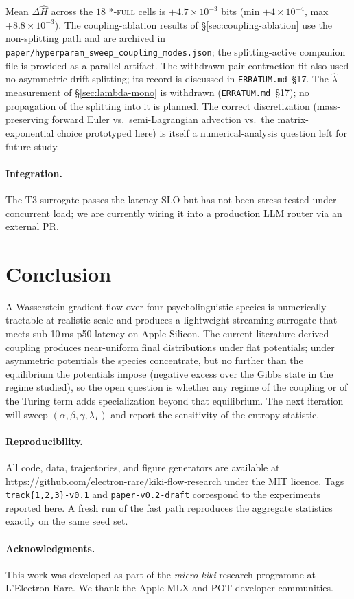 \documentclass[11pt]{article}
\begin{document}
Mean $\Delta \hat H$ across the $18$ \textsc{*-full} cells is
$+4.7 \times 10^{-3}$ bits (min $+4 \times 10^{-4}$, max
$+8.8 \times 10^{-3}$). The coupling-ablation results of
\S\ref{sec:coupling-ablation} use the non-splitting path and are
archived in \texttt{paper/hyperparam\_sweep\_coupling\_modes.json};
the splitting-active companion file is provided as a parallel
artifact. The withdrawn pair-contraction fit also used no
asymmetric-drift splitting; its record is discussed in
\texttt{ERRATUM.md}~\S17.
The $\hat\lambda$ measurement of \S\ref{sec:lambda-mono} is
withdrawn (\texttt{ERRATUM.md}~\S17); no propagation of the
splitting into it is planned. The correct discretization
(mass-preserving forward Euler vs.\ semi-Lagrangian advection vs.\
the matrix-exponential choice prototyped here) is itself a
numerical-analysis question left for future study.

\paragraph{Integration.} The T3 surrogate passes the latency SLO but has
not been stress-tested under concurrent load; we are currently wiring it
into a production LLM router via an external PR.

\section{Conclusion}
\label{sec:conclusion}

A Wasserstein gradient flow over four psycholinguistic species is
numerically tractable at realistic scale and produces a lightweight
streaming surrogate that meets sub-10\,ms p50 latency on Apple Silicon.
The current literature-derived coupling produces near-uniform final
distributions under flat potentials; under asymmetric potentials the
species concentrate, but no further than the equilibrium the potentials
impose (negative excess over the Gibbs state in the regime studied), so
the open question is whether any regime of the coupling or of the
Turing term adds specialization beyond that equilibrium. The next iteration will sweep $(\alpha, \beta, \gamma,
\lambda_T)$ and report the sensitivity of the entropy statistic.

\paragraph{Reproducibility.}
All code, data, trajectories, and figure generators are available at
\url{https://github.com/electron-rare/kiki-flow-research} under the MIT
licence. Tags \texttt{track\{1,2,3\}-v0.1} and \texttt{paper-v0.2-draft}
correspond to the experiments reported here. A fresh run of the fast
path reproduces the aggregate statistics exactly on the same seed set.

\paragraph{Acknowledgments.}
This work was developed as part of the \emph{micro-kiki} research
programme at L'Electron Rare. We thank the Apple MLX and POT developer
communities.



\end{document}
